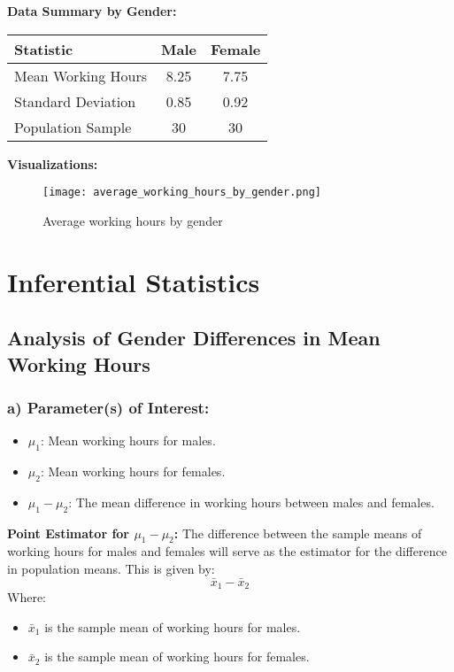 \documentclass[12pt,a4paper]{article}
\begin{document}
\vspace{1em}

\noindent\textbf{Data Summary by Gender:}

\begin{center}
    \begin{tabular}{|l|c|c|}
        \hline
        \textbf{Statistic} & \textbf{Male} & \textbf{Female} \\
        \hline
        Mean Working Hours & 8.25 & 7.75 \\
        \hline
        Standard Deviation & 0.85 & 0.92 \\
        \hline
        Population Sample & 30 & 30 \\
        \hline
    \end{tabular}
\end{center}

\vspace{1em}

\noindent\textbf{Visualizations:}
\begin{figure}[h!]
    \centering
    \texttt{[image: average\_working\_hours\_by\_gender.png]}
    \caption{Average working hours by gender}
\end{figure}



\section{Inferential Statistics}
\subsection{Analysis of Gender Differences in Mean Working Hours}
\vspace{0.5 cm}

\subsubsection{a) Parameter(s) of Interest:}
\begin{itemize}
    \item \(\mu_1\): Mean working hours for males.
    \item \(\mu_2\): Mean working hours for females.
    \item \(\mu_1 - \mu_2\): The mean difference in working hours between males and females.
\end{itemize}

\textbf{Point Estimator for \(\mu_1 - \mu_2\):}
The difference between the sample means of working hours for males and females will serve as the estimator for the difference in population means. This is given by:
\[
\bar{x}_1 - \bar{x}_2
\]
Where:
\begin{itemize}
    \item \(\bar{x}_1\) is the sample mean of working hours for males.
    \item \(\bar{x}_2\) is the sample mean of working hours for females.
\end{itemize}
\end{document}
